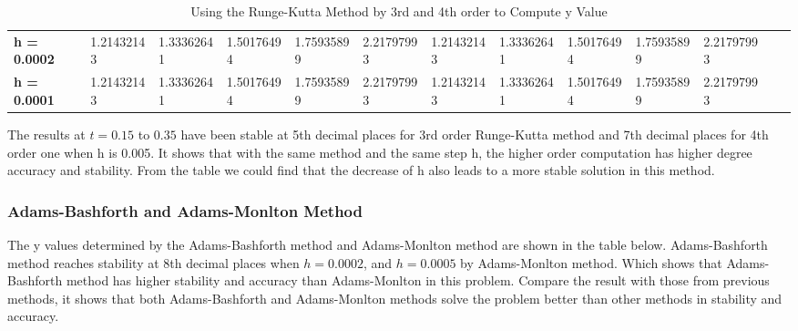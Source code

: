 \documentclass[a4paper]{article}
\begin{document}
\begin{table}[H]
{\begin{tabular}{@{}lllllllllllll@{}}
				\textbf{h = 0.0002}             & 1.21432143                & 1.33362641                            & 1.50176494                            & 1.75935899                            & 2.21797993                                                         & 1.21432143                             & 1.33362641                            & 1.50176494                            & 1.75935899       & 2.21797993               \\
				\textbf{h = 0.0001}             & 1.21432143                             & 1.33362641                            & 1.50176494                            & 1.75935899                            & 2.21797993                                                         & 1.21432143                             & 1.33362641                            & 1.50176494                            & 1.75935899       & 2.21797993              \\
				\bottomrule
			\end{tabular}%
		}
		\caption{Using the Runge-Kutta Method by 3rd and 4th order to Compute y Value}
		\label{tab:IVP2_RK}
	\end{table}
	
	The results at $t = 0.15$ to $0.35$ have been stable at 5th decimal places for 3rd order Runge-Kutta method and 7th decimal places for 4th order one when h is 0.005. It shows that with the same method and the same step h, the higher order computation has higher degree accuracy and stability. From the table we could find that the decrease of h also leads to a more stable solution in this method. 
	
	\subsubsection{Adams-Bashforth and Adams-Monlton Method}
	
	The y values determined by the Adams-Bashforth method and Adams-Monlton method are shown in the table below. Adams-Bashforth method reaches stability at 8th decimal places when $h = 0.0002$, and $h = 0.0005$ by Adams-Monlton method. Which shows that Adams-Bashforth method has higher stability and accuracy than Adams-Monlton in this problem. Compare the result with those from previous methods, it shows that both Adams-Bashforth and Adams-Monlton methods solve the problem better than other methods in stability and accuracy.
	
\end{document}
